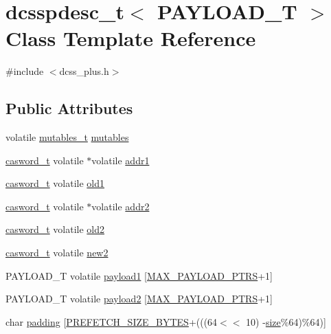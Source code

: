 \hypertarget{classdcsspdesc__t}{}\section{dcsspdesc\+\_\+t$<$ P\+A\+Y\+L\+O\+A\+D\+\_\+T $>$ Class Template Reference}
\label{classdcsspdesc__t}


{\ttfamily \#include $<$dcss\+\_\+plus.\+h$>$}

\subsection*{Public Attributes}
\begin{DoxyCompactItemize}
\item 
volatile \hyperlink{descriptors_8h_a8a5af2749482b19d7515054489efca22}{mutables\+\_\+t} \hyperlink{classdcsspdesc__t_a0c377eb0bb0ca80e67bfdb958bc154a3}{mutables}
\item 
\hyperlink{rq__unsafe_8h_ad45142aaf2ff20a036dc6242b8483e9c}{casword\+\_\+t} volatile $\ast$volatile \hyperlink{classdcsspdesc__t_a07f31abfd3e37e000c9335420843538a}{addr1}
\item 
\hyperlink{rq__unsafe_8h_ad45142aaf2ff20a036dc6242b8483e9c}{casword\+\_\+t} volatile \hyperlink{classdcsspdesc__t_ae4e128e33e5819e8df288c149ad6a9c2}{old1}
\item 
\hyperlink{rq__unsafe_8h_ad45142aaf2ff20a036dc6242b8483e9c}{casword\+\_\+t} volatile $\ast$volatile \hyperlink{classdcsspdesc__t_ae7f0547246e681d570349d653999d04a}{addr2}
\item 
\hyperlink{rq__unsafe_8h_ad45142aaf2ff20a036dc6242b8483e9c}{casword\+\_\+t} volatile \hyperlink{classdcsspdesc__t_a898e3c1a51fff0a73c484b1f3ed2fc49}{old2}
\item 
\hyperlink{rq__unsafe_8h_ad45142aaf2ff20a036dc6242b8483e9c}{casword\+\_\+t} volatile \hyperlink{classdcsspdesc__t_a26e12bf581a9cf3b5007d6affed2d944}{new2}
\item 
P\+A\+Y\+L\+O\+A\+D\+\_\+T volatile \hyperlink{classdcsspdesc__t_a0e0868123124f0cb23e875efe07bf095}{payload1} \mbox{[}\hyperlink{dcss__plus_8h_af06e916cb13168b5e10308a196165616}{M\+A\+X\+\_\+\+P\+A\+Y\+L\+O\+A\+D\+\_\+\+P\+T\+RS}+1\mbox{]}
\item 
P\+A\+Y\+L\+O\+A\+D\+\_\+T volatile \hyperlink{classdcsspdesc__t_a2853d789dfb225f45783af8c1c7d2b3e}{payload2} \mbox{[}\hyperlink{dcss__plus_8h_af06e916cb13168b5e10308a196165616}{M\+A\+X\+\_\+\+P\+A\+Y\+L\+O\+A\+D\+\_\+\+P\+T\+RS}+1\mbox{]}
\item 
char \hyperlink{classdcsspdesc__t_a4708b8a87b5acd2011cff6783260bd67}{padding} \mbox{[}\hyperlink{plaf_8h_a9492d3f4847aa8514510373df7ad0e73}{P\+R\+E\+F\+E\+T\+C\+H\+\_\+\+S\+I\+Z\+E\+\_\+\+B\+Y\+T\+ES}+(((64$<$$<$ 10) -\/\hyperlink{classdcsspdesc__t_a29649c162a785ff33c3fb6967a9838f7}{size}\%64)\%64)\mbox{]}
\end{DoxyCompactItemize}
